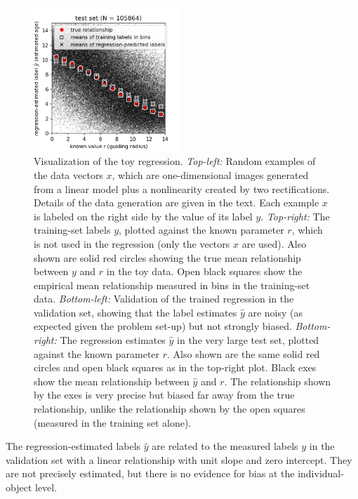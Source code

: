 \documentclass[11pt]{article}
\begin{document}
\begin{figure}[p!]
\includegraphics[width=0.49\textwidth]{notebooks/test_data_results.png}
\caption{\sffamily%
Visualization of the toy regression. \textsl{Top-left:} Random examples of the data vectors $x$, which are one-dimensional images generated from a linear model plus a nonlinearity created by two rectifications. Details of the data generation are given in the text. Each example $x$ is labeled on the right side by the value of its label $y$. \textsl{Top-right:} The training-set labels $y$, plotted against the known parameter $r$, which is not used in the regression (only the vectors $x$ are used). Also shown are solid red circles showing the true mean relationship between $y$ and $r$ in the toy data. Open black squares show the empirical mean relationship measured in bins in the training-set data. \textsl{Bottom-left:} Validation of the trained regression in the validation set, showing that the label estimates $\hat{y}$ are noisy (as expected given the problem set-up) but not strongly biased. \textsl{Bottom-right:} The regression estimates $\hat{y}$ in the very large test set, plotted against the known parameter $r$. Also shown are the same solid red circles and open black squares as in the top-right plot. Black exes show the mean relationship between $\hat{y}$ and $r$. The relationship shown by the exes is very precise but biased far away from the true relationship, unlike the relationship shown by the open squares (measured in the training set alone).\label{fig:regression}}
\end{figure}

The regression-estimated labels $\hat{y}$ are related to the measured labels $y$ in the validation set with a linear relationship with unit slope and zero intercept.
They are not precisely estimated, but there is no evidence for bias at the individual-object level.
\end{document}
